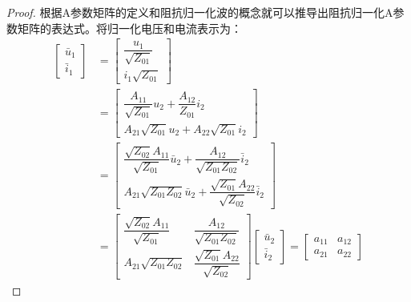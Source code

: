     \begin{tcbproof}\begin{proof}
        根据A参数矩阵的定义和阻抗归一化波的概念就可以推导出阻抗归一化A参数矩阵的表达式。将归一化电压和电流表示为：
        \begin{equation}
            \begin{aligned}
                \begin{bmatrix}
                    \bar{u}_1\\
                    \bar{i}_1
                \end{bmatrix}
                &=\begin{bmatrix}
                    \dfrac{u_1}{\sqrt{Z_{01}}}\\
                    i_1\sqrt{Z_{01}}
                \end{bmatrix}\\
                &=\begin{bmatrix}
                    \dfrac{A_{11}}{\sqrt{Z_{01}}}u_2+\dfrac{A_{12}}{Z_{01}}i_2\\
                    A_{21}\sqrt{Z_{01}}u_2+A_{22}\sqrt{Z_{01}}i_2
                \end{bmatrix}\\
                &=\begin{bmatrix}
                    \dfrac{\sqrt{Z_{02}}A_{11}}{\sqrt{Z_{01}}}\bar{u}_2+\dfrac{A_{12}}{\sqrt{Z_{01}Z_{02}}}\bar{i}_2\\
                    A_{21}\sqrt{Z_{01}Z_{02}}\bar{u}_2+\dfrac{\sqrt{Z_{01}}A_{22}}{\sqrt{Z_{02}}}\bar{i}_2
                \end{bmatrix}\\
                &=\begin{bmatrix}
                    \dfrac{\sqrt{Z_{02}}A_{11}}{\sqrt{Z_{01}}} & \dfrac{A_{12}}{\sqrt{Z_{01}Z_{02}}}\\
                    A_{21}\sqrt{Z_{01}Z_{02}} & \dfrac{\sqrt{Z_{01}}A_{22}}{\sqrt{Z_{02}}}
                \end{bmatrix}
                \begin{bmatrix}
                    \bar{u}_2\\
                    \bar{i}_2
                \end{bmatrix}
                =\begin{bmatrix}
                    a_{11}&a_{12}\\
                    a_{21}&a_{22}
                \end{bmatrix}

\end{aligned}
\end{equation}
\end{proof}
\end{tcbproof}

